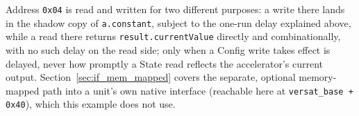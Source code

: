Address \texttt{0x04} is read and written for two different purposes: a write there lands in the shadow copy of \texttt{a.constant}, subject to the one-run delay explained above, while a read there returns \texttt{result.currentValue} directly and combinationally, with no such delay on the read side; only when a Config write takes effect is delayed, never how promptly a State read reflects the accelerator's current output. Section~\ref{sec:if_mem_mapped} covers the separate, optional memory-mapped path into a unit's own native interface (reachable here at \texttt{versat\_base + 0x40}), which this example does not use.
